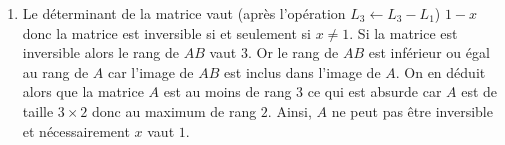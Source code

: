 \documentclass[a4paper,10pt]{report}
\begin{document}
\corr 
\begin{enumerate}
\item Le déterminant de la matrice vaut (après l'opération $L_3 \leftarrow L_3- L_1$) $1-x$ donc la matrice est inversible si et seulement si $x \neq 1$. Si la matrice est inversible alors le rang de $AB$ vaut $3$. Or le rang de $AB$ est inférieur ou égal au rang de $A$ car l'image de $AB$ est inclus dans l'image de $A$. On en déduit alors que la matrice $A$ est au moins de rang $3$ ce qui est absurde car $A$ est de taille $3 \times 2$ donc au maximum de rang $2$. Ainsi, $A$ ne peut pas être inversible et nécessairement $x$ vaut $1$.


\end{enumerate}
\end{document}
